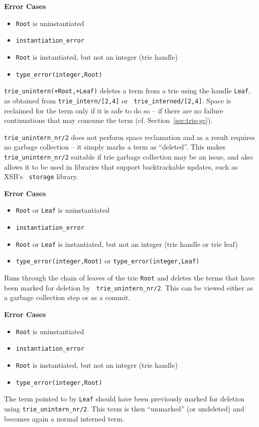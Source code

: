 \begin{description}
{\bf Error Cases}
\begin{itemize}
\item 	{\tt Root} is uninstantiated
\bi
\item 	 {\tt instantiation\_error}
\ei
\item 	{\tt Root} is instantiated, but not an integer (trie handle)
\bi
\item 	 {\tt type\_error(integer,Root)}
\ei
\end{itemize}

{\tt trie\_unintern(+Root,+Leaf)} deletes a term from a trie using the
handle {\tt Leaf}, as obtained from {\tt trie\_intern/[2,4]} or {\tt
  trie\_interned/[2,4]}.  Space is reclaimed for the term only if it
is safe to do so -- if there are no failure continuations that may
consume the term (cf. Section~\ref{sec:trie-gc}).

{\tt trie\_unintern\_nr/2} does not perform space reclamation and as a
result requires no garbage collection -- it simply marks a term as
``deleted''.  This makes {\tt trie\_unintern\_nr/2} suitable if trie
garbage collection may be an issue, and also allows it to be used in
libraries that support backtrackable updates, such as XSB's {\tt
  storage} library.

{\bf Error Cases}
\begin{itemize}
\item 	{\tt Root} or {\tt Leaf} is uninstantiated
\bi
\item 	 {\tt instantiation\_error}
\ei
\item 	{\tt Root} or {\tt Leaf} is instantiated, but not an integer
  (trie handle or trie leaf) 
\bi
\item 	 {\tt type\_error(integer,Root)} or {\tt type\_error(integer,Leaf)}
\ei
\end{itemize}

Runs through the chain of leaves of the trie {\tt Root} and deletes
the terms that have been marked for deletion by {\tt
  trie\_unintern\_nr/2}. This can be viewed either as a garbage
collection step or as a commit.

{\bf Error Cases}
\begin{itemize}
\item 	{\tt Root} is uninstantiated
\bi
\item 	 {\tt instantiation\_error}
\ei
\item 	{\tt Root} is instantiated, but not an integer (trie handle)
\bi
\item 	 {\tt type\_error(integer,Root)}
\ei
\end{itemize}
The term pointed to by {\tt Leaf} should have been previously marked
for deletion using {\tt trie\_unintern\_nr/2}. This term is then
``unmarked'' (or undeleted) and becomes again a normal interned term.


\end{description}
